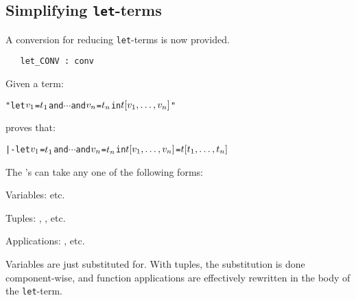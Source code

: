 \subsection{Simplifying {\tt let}-terms}\label{let-terms}

A conversion for reducing {\tt let}-terms is now provided.

\begin{boxed}
\begin{verbatim}
   let_CONV : conv
\end{verbatim}\end{boxed}

\noindent Given a term:

\begin{hol}\begin{alltt}
   "let \(v\sb{1}\) = \(t\sb{1}\) and \(\cdots\) and \(v\sb{n}\) = \(t\sb{n}\) in \(t[v\sb{1},\ldots,v\sb{n}]\)"
\end{alltt}\end{hol}

\noindent {} proves that:

\begin{hol}\begin{alltt}
   |- let \(v\sb{1}\) = \(t\sb{1}\) and \(\cdots\) and \(v\sb{n}\) = \(t\sb{n}\) in \(t[v\sb{1},\ldots,v\sb{n}]\)  =  \(t[t\sb{1},\ldots,t\sb{n}]\)
\end{alltt}\end{hol}

\noindent The 's can take any one of the following forms:

\begin{myenumerate}
\item Variables:     etc.
\item Tuples:   , ,  etc.
\item Applications: ,  etc.
\end{myenumerate}

\noindent Variables are just substituted for. With tuples, the substitution is
done component-wise, and function applications are effectively
rewritten in the body of the {\tt let}-term.

